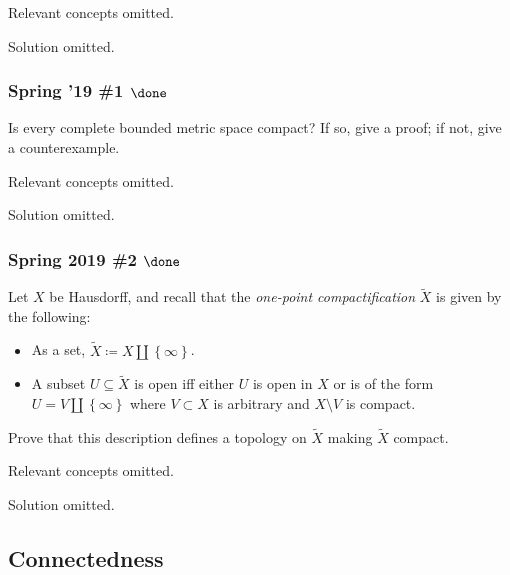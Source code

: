 Relevant concepts omitted.

Solution omitted.

\hypertarget{spring-19-1-done}{%
\subsubsection{\texorpdfstring{Spring '19 \#1
\(\done\)}{Spring '19 \#1 \textbackslash done}}\label{spring-19-1-done}}

\begin{problem}[?]

Is every complete bounded metric space compact? If so, give a proof; if
not, give a counterexample.

\end{problem}


Relevant concepts omitted.

Solution omitted.

\hypertarget{spring-2019-2-done}{%
\subsubsection{\texorpdfstring{Spring 2019 \#2
\(\done\)}{Spring 2019 \#2 \textbackslash done}}\label{spring-2019-2-done}}

\begin{problem}[?]

Let \(X\) be Hausdorff, and recall that the \emph{one-point
compactification} \(\tilde X\) is given by the following:

\begin{itemize}
\item
  As a set, \(\tilde X \coloneqq X{\coprod}\left\{{\infty}\right\}\).
\item
  A subset \(U\subseteq \tilde X\) is open iff either \(U\) is open in
  \(X\) or is of the form \(U = V{\coprod}\left\{{\infty}\right\}\)
  where \(V\subset X\) is arbitrary and \(X\setminus V\) is compact.
\end{itemize}

Prove that this description defines a topology on \(\tilde X\) making
\(\tilde X\) compact.

\end{problem}

Relevant concepts omitted.

Solution omitted.

\hypertarget{connectedness}{%
\subsection{Connectedness}\label{connectedness}}

